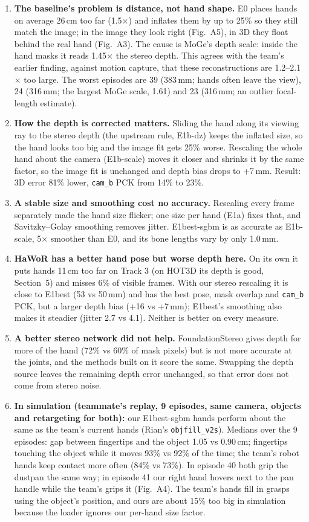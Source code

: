 \documentclass[10pt]{article}
\begin{document}
\begin{enumerate}[leftmargin=1.4em]
\item \textbf{The baseline's problem is distance, not hand shape.} E0 places hands on average 26\,cm too far (1.5$\times$)
and inflates them by up to 25\% so they still match the image; in the image they look right (Fig.~A5), in 3D they float
behind the real hand (Fig.~A3). The cause is MoGe's depth scale: inside the hand masks it reads 1.45$\times$ the stereo
depth. This agrees with the team's earlier finding, against motion capture, that these reconstructions are 1.2--2.1$\times$
too large. The worst episodes are 39 (383\,mm; hands often leave the view), 24 (316\,mm; the largest MoGe scale, 1.61)
and 23 (316\,mm; an outlier focal-length estimate).
\item \textbf{How the depth is corrected matters.} Sliding the hand along its viewing ray to the stereo depth (the
upstream rule, E1b-dz) keeps the inflated size, so the hand looks too big and the image fit gets 25\% worse. Rescaling the
whole hand about the camera (E1b-scale) moves it closer and shrinks it by the same factor, so the image fit is unchanged
and depth bias drops to +7\,mm. Result: 3D error 81\% lower, \texttt{cam\_b} PCK from 14\% to 23\%.
\item \textbf{A stable size and smoothing cost no accuracy.} Rescaling every frame separately made the hand size flicker;
one size per hand (E1a) fixes that, and Savitzky--Golay smoothing removes jitter. E1best-sgbm is as accurate as E1b-scale,
5$\times$ smoother than E0, and its bone lengths vary by only 1.0\,mm.
\item \textbf{HaWoR has a better hand pose but worse depth here.} On its own it puts hands 11\,cm too far on Track 3
(on HOT3D its depth is good, Section~5) and misses 6\% of visible frames. With our stereo rescaling it is close to E1best
(53 vs 50\,mm) and has the best pose, mask overlap and \texttt{cam\_b} PCK, but a larger depth bias (+16 vs +7\,mm);
E1best's smoothing also makes it steadier (jitter 2.7 vs 4.1). Neither is better on every measure.
\item \textbf{A better stereo network did not help.} FoundationStereo gives depth for more of the hand (72\% vs 60\% of
mask pixels) but is not more accurate at the joints, and the methods built on it score the same. Swapping the depth source
leaves the remaining depth error unchanged, so that error does not come from stereo noise.
\item \textbf{In simulation (teammate's replay, 9 episodes, same camera, objects and retargeting for both):} our
E1best-sgbm hands perform about the same as the team's current hands (Rian's \texttt{objfill\_v2s}). Medians over the 9
episodes: gap between fingertips and the object 1.05 vs 0.90\,cm; fingertips touching the object while it moves 93\% vs
92\% of the time; the team's robot hands keep contact more often (84\% vs 73\%). In episode 40 both grip the dustpan the
same way; in episode 41 our right hand hovers next to the pan handle while the team's grips it (Fig.~A4). The team's hands
fill in grasps using the object's position, and ours are about 15\% too big in simulation because the loader ignores our
per-hand size factor.
\end{enumerate}
\end{document}

